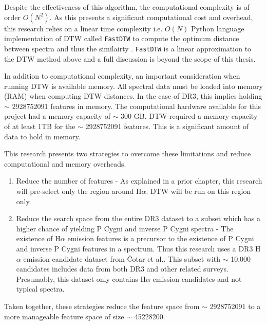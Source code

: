 Despite the effectiveness of this algorithm, the computational complexity is of order $O(N^2)$. As this presents a significant computational cost and overhead, this research relies on a linear time complexity i.e. $O(N)$ Python language implementation of DTW called \texttt{FastDTW} to compute the optimum distance between spectra and thus the similairty \cite{salvador2007toward}. \texttt{FastDTW} is a linear approximation to the DTW method above and a full discussion is beyond the scope of this thesis. 

In addition to computational complexity, an important consideration when running DTW is available memory. All spectral data must be loaded into memory (RAM) when computing DTW distances. In the case of DR3, this implies holding $\sim$ \num[round-precision=2,round-mode=figures, scientific-notation=true]{2928752091} features in memory. The computational hardware available for this project had a memory capacity of $\sim$ 300 GB. DTW required a memory capacity of at least 1TB for the $\sim$ \num[round-precision=2,round-mode=figures, scientific-notation=true]{2928752091} features. This is a significant amount of data to hold in memory. 

This research presents two strategies to overcome these limitations and reduce computational and memory overheads.

\begin{enumerate}
    \item Reduce the number of features - As explained in a prior chapter, this research will pre-select only the region around H$\alpha$. DTW will be run on this region only.
    \item Reduce the search space from the entire DR3 dataset to a subset which has a higher chance of yielding P Cygni and inverse P Cygni spectra - The existence of H$\alpha$ emission features is a precursor to the existence of P Cygni and inverse P Cygni features in a spectrum. Thus this research uses a DR3 H$\alpha$ emission candidate dataset from Čotar et al.\cite{vcotar2021galah}. This subset with $\sim$ 10,000 candidates includes data from both DR3 and other related surveys. Presumably, this dataset only contains H$\alpha$ emission candidates and not typical spectra.
\end{enumerate}

Taken together, these strategies reduce the feature space from $\sim$ \num[round-precision=2,round-mode=figures, scientific-notation=true]{2928752091} to a more manageable feature space of size $\sim$ \num[round-precision=2,round-mode=figures, scientific-notation=true]{45228200}.

